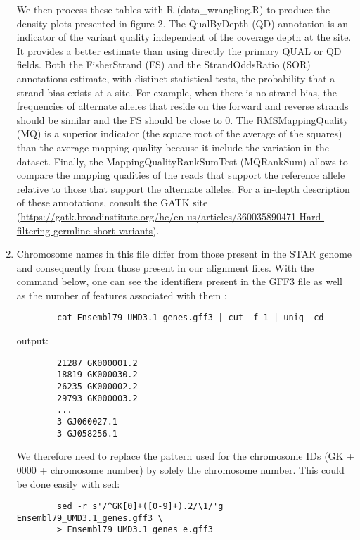 \begin{enumerate}
	
	
	We then process these tables with R (data\_wrangling.R) to produce the density plots presented in figure 2. The QualByDepth (QD) annotation is an indicator of the variant quality independent of the coverage depth at the site. It provides a better estimate than using directly the primary QUAL or QD fields. Both the FisherStrand (FS) and the StrandOddsRatio (SOR) annotations estimate, with distinct statistical tests, the probability that a strand bias exists at a site. For example, when there is no strand bias, the frequencies of alternate alleles that reside on the forward and reverse strands should be similar and the FS should be close to 0. The RMSMappingQuality (MQ) is a superior indicator (the square root of the average of the squares) than  the average mapping quality because it include the variation in the dataset. Finally, the MappingQualityRankSumTest (MQRankSum) allows to compare the mapping qualities of the reads that support the reference allele relative to those that support the alternate alleles. For a in-depth description of these annotations, consult the GATK site (\href{https://gatk.broadinstitute.org/hc/en-us/articles/360035890471-Hard-filtering-germline-short-variants}{https://gatk.broadinstitute.org/hc/en-us/articles/360035890471-Hard-filtering-germline-short-variants}).
	
	
	
	\item Chromosome names in this file differ from those present in the STAR genome and consequently from those present in our alignment files. With the command below, one can see the identifiers present in the GFF3 file as well as the number of features associated with them :
	
	\begin{verbatim}
		cat Ensembl79_UMD3.1_genes.gff3 | cut -f 1 | uniq -cd
	\end{verbatim}
	
	
	\noindent output:
	\begin{verbatim}
		21287 GK000001.2
		18819 GK000030.2
		26235 GK000002.2
		29793 GK000003.2
		...
		3 GJ060027.1
		3 GJ058256.1
	\end{verbatim}
	
	We therefore need to replace the pattern used for the chromosome IDs (GK + 0000 + chromosome number) by solely the chromosome number. This could be done easily with sed:
	
	\begin{verbatim}
		sed -r s'/^GK[0]+([0-9]+).2/\1/'g Ensembl79_UMD3.1_genes.gff3 \
		> Ensembl79_UMD3.1_genes_e.gff3
	\end{verbatim}
	

\end{enumerate}
